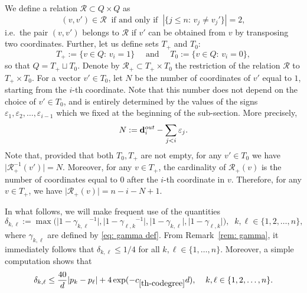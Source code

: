 \documentclass[12pt]{article}
\theoremstyle{definition}
\theoremstyle{plain}
\def\OutDeg{{\bf d}^{out}}
\def\relation{{\mathcal R}}
\begin{document}
We define a relation $\relation\subset Q\times Q$
as
\begin{equation}\label{eq: relation definition}
(v,v')\in \relation\;\;\mbox{if and only if}\;\;|\{j\leq n:\,v_j\neq v_j'\}|=2,
\end{equation}
i.e.\ the pair $(v,v')$ belongs to $\relation$ if $v'$ can be obtained from $v$ by transposing two coordinates.
Further, let us define sets $T_+$ and $T_0$:
\begin{equation}\label{eq: T+ T0 definition}
T_+:=\{v\in Q:\, v_i=1\}\quad \text{ and }\quad T_0:=\{v\in Q:\, v_i=0\},
\end{equation}
so that $Q=T_+\sqcup T_0$. Denote by $\relation_+\subset T_+\times T_0$ the restriction of the relation
$\relation$ to $T_+\times T_0$. 
For a vector $v'\in T_0$, let $N$ be the number of coordinates of $v'$ equal to $1$,
starting from the $i$-th coordinate.
Note that this number does not depend on the choice of $v'\in T_0$,
and is entirely determined by the values of the signs $\varepsilon_1,\varepsilon_2,\ldots,\varepsilon_{i-1}$
which we fixed at the beginning of the sub-section. More precisely, 
\begin{equation}\label{eq: N definition}
N:= \OutDeg_i-\sum_{j<i} \varepsilon_j.
\end{equation}
Note that, provided that both $T_0,T_+$ are not empty,
for any $v'\in T_0$ we have $\vert \relation_+^{-1}(v')\vert=N$.
Moreover, for any $v\in T_+$, the cardinality of $\relation_+(v)$ is the number of coordinates equal to $0$ after 
the $i$-th coordinate in $v$. Therefore, for any $v\in T_+$, we have $\vert \relation_+(v)\vert= n-i-N+1$.

In what follows, we will make frequent use of the quantities
\begin{equation}\label{eq: delta def}
\delta_{k,\ell}:= \max\big( \vert 1-{\gamma_{k,\ell}}^{-1}\vert,
\vert 1-{\gamma_{\ell,k}}^{-1}\vert,\vert 1-\gamma_{k,\ell}\vert,\vert 1-\gamma_{\ell,k}\vert\big),\;\;k,\ell\in\{1,2,\ldots,n\},
\end{equation}
where $\gamma_{k,\ell}$ are defined by \eqref{eq: gamma def}.
From Remark~\ref{rem: gamma}, it immediately follows that $\delta_{k,\ell}\leq 1/4$ for all $k,\ell\in\{1,\ldots,n\}$.
Moreover,
a simple computation shows that
\begin{equation}\label{eq: delta easy bound}
\delta_{k,\ell}\leq \frac{40}{d}|p_k-p_\ell|+4\exp(-c_{\ref{th-codegree}}d),\;\;\;\;k,\ell\in\{1,2,\ldots,n\}.
\end{equation}
\end{document}
